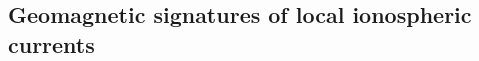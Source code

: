 \documentclass[a4paper,fleqn]{cas-dc}
\begin{document}



  


\subsection{Geomagnetic signatures of local ionospheric currents}
\label{diono}
\end{document}
